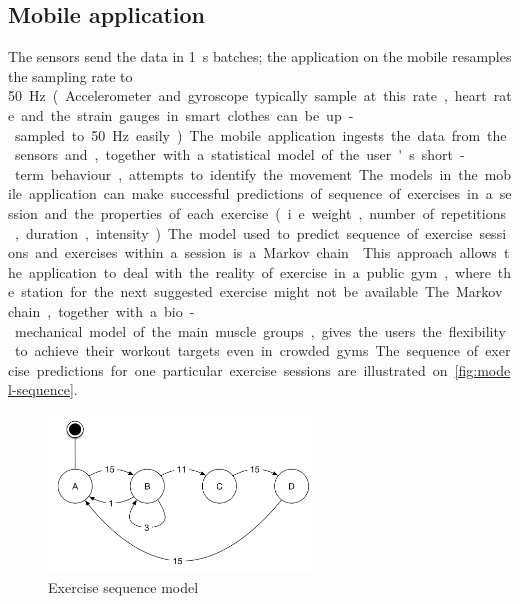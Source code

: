 \documentclass[a4paper, 10 pt, conference]{IEEEtran}
\begin{document}
\subsection{Mobile application}

The sensors send the data in \SI{1}{\second} batches; the application on the mobile resamples the sampling rate to \SI{50}\hertz. (Accelerometer and gyroscope typically sample at this rate, heart rate and the strain gauges in smart clothes can be up-sampled to \SI{50}{\hertz} easily.) The mobile application ingests the data from the sensors and, together with a statistical model of the user's short-term behaviour, attempts to identify the movement. The models in the mobile application can make successful predictions of sequence of exercises in a session and the properties of each exercise (i.e. weight, number of repetitions, duration, intensity). The model used to predict sequence of exercise sessions and exercises within a session is a Markov chain \cite{markov-chain-exercise}. This approach allows the application to deal with the reality of exercise in a public gym, where the station for the next suggested exercise might not be available. The Markov chain, together with a bio-mechanical model of the main muscle groups, gives the users the flexibility to achieve their workout targets even in crowded gyms. The sequence of exercise predictions for one particular exercise sessions are illustrated on \autoref{fig:model-sequence}.

\begin{figure}[h]
	\begin{center}
		\caption{Exercise sequence model}
		\label{fig:model-sequence}
		\includegraphics[width=7cm,keepaspectratio]{ri-model-sequence.png}
	\end{center}
\end{figure}
\end{document}
